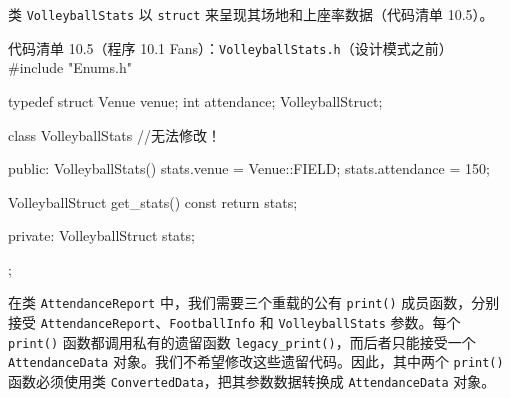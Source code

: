 类 \texttt{Volleyball\allowbreak{}Stats} 以 \texttt{struct} 来呈现其场地和上座率数据（代码清单 10.5）。

\begin{codeboxt}{代码清单 10.5（程序 10.1 Fans）：\texttt{Volleyball\allowbreak{}Stats.\allowbreak{}h}（设计模式之前）}
#include "Enums.h"

typedef struct
{
    Venue venue;
    int   attendance;
} VolleyballStruct;

class VolleyballStats  //无法修改！
{
public:
    VolleyballStats()
    {
        stats.venue      = Venue::FIELD;
        stats.attendance = 150;
    }

    VolleyballStruct get_stats() const { return stats; }

private:
    VolleyballStruct stats;
};
\end{codeboxt}

在类 \texttt{Attendance\allowbreak{}Report} 中，我们需要三个重载的公有 \texttt{print()} 成员函数，分别接受 \texttt{Attendance\allowbreak{}Report}、\texttt{Football\allowbreak{}Info} 和 \texttt{Volleyball\allowbreak{}Stats} 参数。每个 \texttt{print()} 函数都调用私有的遗留函数 \texttt{legacy\_\allowbreak{}print(\allowbreak{})\allowbreak{}}，而后者只能接受一个 \texttt{Attendance\allowbreak{}Data} 对象。我们不希望修改这些遗留代码。因此，其中两个 \texttt{print()} 函数必须使用类 \texttt{Converted\allowbreak{}Data}，把其参数数据转换成 \texttt{Attendance\allowbreak{}Data} 对象。

